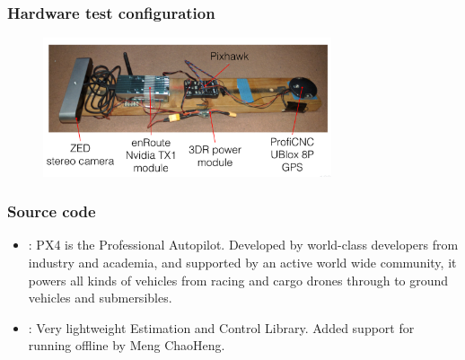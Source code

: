 \documentclass{beamer}
\begin{document}
\begin{frame}
	\frametitle{Hardware test configuration}
	\begin{figure}
		\centering
		\includegraphics[width=8.5cm]{test.png}
	\end{figure}
\end{frame}
\begin{frame}
	\frametitle{Source code}

	\begin{itemize}
		\item \href{ https://github.com/PX4/PX4-Autopilot}{}: PX4 is the Professional Autopilot. Developed by world-class developers from industry and academia, and supported by an active world wide community, it powers all kinds of vehicles from racing and cargo drones through to ground vehicles and submersibles.
		
		\item \href{https://github.com/mengchaoheng/PX4-ECL}{}: Very lightweight Estimation and Control Library. Added support for running offline by Meng ChaoHeng.
	\end{itemize}
\end{frame}
\end{document}
